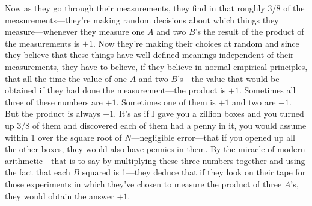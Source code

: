 \documentclass[twocolumn,prb]{revtex4}
\begin{document}
Now as they go through their measurements, they find in that roughly 3/8 of the measurements---they're making random decisions about which things they  measure---whenever they measure one $A$ and two $B$'s the result of the product of the measurements is $+1$. Now they're making their choices at random and since they believe that these things have well-defined meanings independent of their measurements, they have to believe, if they believe in normal empirical principles, that all the time the value of one $A$ and two $B$'s---the value that would be obtained if they had done the measurement---the product is $+1$. Sometimes all three of these numbers are $+1$. Sometimes one of them is $+1$ and two are $-1$. But the product is always $+1$. It's as if I gave you a zillion boxes and you turned up 3/8 of them and discovered each of them had a penny in it, you would assume within 1 over the square root of $N$---negligible error---that if you opened up all the other boxes, they would also have pennies in them. By the miracle of modern arithmetic---that is to say by multiplying these three numbers together and using the fact that each $B$ squared is 1---they deduce that if they look on their tape for those experiments in which they've chosen to measure the product of three $A$'s, they would obtain the answer $+1$.
\end{document}
